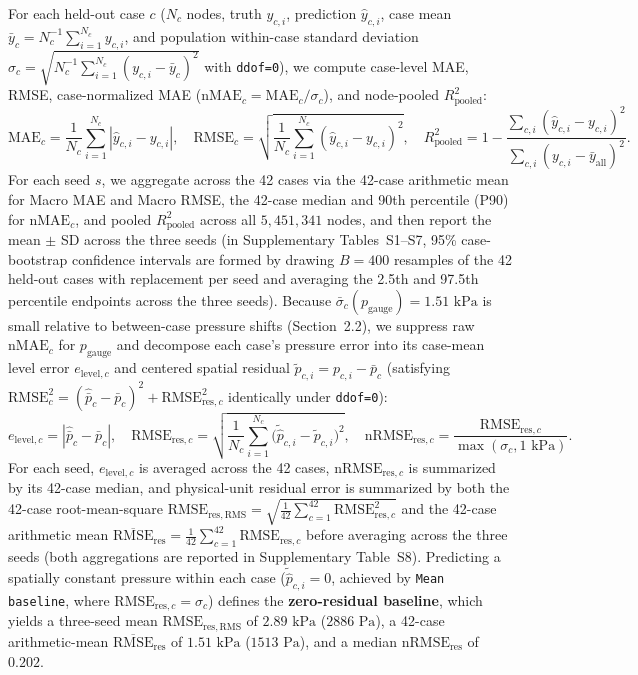 \documentclass[11pt]{article}
\begin{document}
For each held-out case $c$ ($N_c$ nodes, truth $y_{c,i}$, prediction $\hat{y}_{c,i}$, case mean $\bar{y}_c = N_c^{-1}\sum_{i=1}^{N_c} y_{c,i}$, and population within-case standard deviation $\sigma_c = \sqrt{N_c^{-1}\sum_{i=1}^{N_c}(y_{c,i}-\bar{y}_c)^2}$ with \texttt{ddof=0}), we compute case-level MAE, RMSE, case-normalized MAE ($\mathrm{nMAE}_c = \mathrm{MAE}_c / \sigma_c$), and node-pooled $R^2_{\mathrm{pooled}}$:
\begin{equation}
  \mathrm{MAE}_c = \frac{1}{N_c}\sum_{i=1}^{N_c} |\hat{y}_{c,i} - y_{c,i}|, \quad
  \mathrm{RMSE}_c = \sqrt{\frac{1}{N_c}\sum_{i=1}^{N_c} (\hat{y}_{c,i} - y_{c,i})^2}, \quad
  R^2_{\mathrm{pooled}} = 1 - \frac{\sum_{c,i}(\hat{y}_{c,i} - y_{c,i})^2}{\sum_{c,i}(y_{c,i} - \bar{y}_{\mathrm{all}})^2}.
\end{equation}
For each seed $s$, we aggregate across the 42 cases via the 42-case arithmetic mean for Macro MAE and Macro RMSE, the 42-case median and 90th percentile (P90) for $\mathrm{nMAE}_c$, and pooled $R^2_{\mathrm{pooled}}$ across all $5,451,341$ nodes, and then report the mean $\pm$ SD across the three seeds (in Supplementary Tables~S1--S7, 95\% case-bootstrap confidence intervals are formed by drawing $B=400$ resamples of the 42 held-out cases with replacement per seed and averaging the 2.5th and 97.5th percentile endpoints across the three seeds). Because $\bar{\sigma}_c(p_{\mathrm{gauge}}) = 1.51\text{ kPa}$ is small relative to between-case pressure shifts (Section~2.2), we suppress raw $\mathrm{nMAE}_c$ for $p_{\mathrm{gauge}}$ and decompose each case's pressure error into its case-mean level error $e_{\mathrm{level},c}$ and centered spatial residual $\tilde{p}_{c,i} = p_{c,i} - \bar{p}_c$ (satisfying $\mathrm{RMSE}_c^2 = (\hat{\bar{p}}_c - \bar{p}_c)^2 + \mathrm{RMSE}_{\mathrm{res},c}^2$ identically under \texttt{ddof=0}):
\begin{equation}
  e_{\mathrm{level},c} = |\hat{\bar{p}}_c - \bar{p}_c|, \quad
  \mathrm{RMSE}_{\mathrm{res},c} = \sqrt{\frac{1}{N_c}\sum_{i=1}^{N_c}\bigl(\tilde{\hat{p}}_{c,i} - \tilde{p}_{c,i}\bigr)^2}, \quad
  \mathrm{nRMSE}_{\mathrm{res},c} = \frac{\mathrm{RMSE}_{\mathrm{res},c}}{\max(\sigma_c, 1\text{ kPa})}.
\end{equation}
For each seed, $e_{\mathrm{level},c}$ is averaged across the 42 cases, $\mathrm{nRMSE}_{\mathrm{res},c}$ is summarized by its 42-case median, and physical-unit residual error is summarized by both the 42-case root-mean-square $\mathrm{RMSE}_{\mathrm{res,RMS}} = \sqrt{\frac{1}{42}\sum_{c=1}^{42}\mathrm{RMSE}_{\mathrm{res},c}^2}$ and the 42-case arithmetic mean $\overline{\mathrm{RMSE}}_{\mathrm{res}} = \frac{1}{42}\sum_{c=1}^{42}\mathrm{RMSE}_{\mathrm{res},c}$ before averaging across the three seeds (both aggregations are reported in Supplementary Table~S8). Predicting a spatially constant pressure within each case ($\tilde{\hat{p}}_{c,i} = 0$, achieved by \texttt{Mean baseline}, where $\mathrm{RMSE}_{\mathrm{res},c} = \sigma_c$) defines the \textbf{zero-residual baseline}, which yields a three-seed mean $\mathrm{RMSE}_{\mathrm{res,RMS}}$ of $2.89\text{ kPa}$ ($2886\text{ Pa}$), a 42-case arithmetic-mean $\overline{\mathrm{RMSE}}_{\mathrm{res}}$ of $1.51\text{ kPa}$ ($1513\text{ Pa}$), and a median $\mathrm{nRMSE}_{\mathrm{res}}$ of $0.202$.
\end{document}
